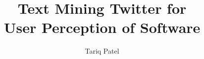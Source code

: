 \documentclass[12pt]{third-rep}
\title{Text Mining Twitter for\\User Perception of Software}
\author{Tariq Patel}
\begin{document}
\dotitleandabstract

\tableofcontents
\listoffigures
\listoftables
\lstlistoflistings










\nocite{*}

\appendix



\end{document}
